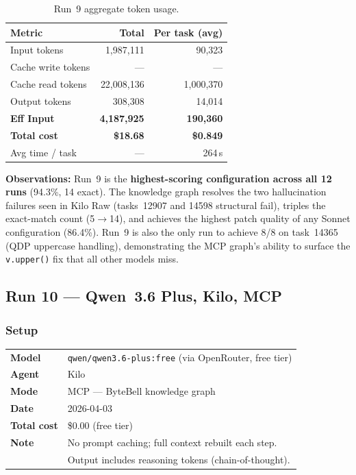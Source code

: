 \begin{table}[h]
\centering
\caption{Run~9 aggregate token usage.}\label{tab:r9-tokens}
\begin{tabular}{lrr}
\toprule
\textbf{Metric} & \textbf{Total} & \textbf{Per task (avg)} \\
\midrule
Input tokens         & 1,987,111   & 90,323 \\
Cache write tokens   & ---         & --- \\
Cache read tokens    & 22,008,136  & 1,000,370 \\
Output tokens        & 308,308     & 14,014 \\
\midrule
\textbf{Eff Input}   & \textbf{4,187,925} & \textbf{190,360} \\
\textbf{Total cost}  & \textbf{\$18.68}   & \textbf{\$0.849} \\
Avg time / task      & ---         & 264\,s \\
\bottomrule
\end{tabular}
\end{table}

\noindent
\textbf{Observations:} Run~9 is the \textbf{highest-scoring configuration across all
12 runs} (94.3\%, 14 exact). The knowledge graph resolves the two hallucination
failures seen in Kilo Raw (tasks~12907 and 14598 structural fail), triples the
exact-match count (5$\to$14), and achieves the highest patch quality of any
Sonnet configuration (86.4\%).
Run~9 is also the only run to achieve 8/8 on task~14365 (QDP uppercase
handling), demonstrating the MCP graph's ability to surface
the \texttt{v.upper()} fix that all other models miss.

\subsection{Run 10 --- Qwen~3.6 Plus, Kilo, MCP}
\label{sec:run10}

\subsubsection{Setup}

\begin{tabular}{ll}
\textbf{Model}     & \texttt{qwen/qwen3.6-plus:free} (via OpenRouter, free tier) \\
\textbf{Agent}     & Kilo \\
\textbf{Mode}      & MCP --- ByteBell knowledge graph \\
\textbf{Date}      & 2026-04-03 \\
\textbf{Total cost} & \$0.00 (free tier) \\
\textbf{Note}      & No prompt caching; full context rebuilt each step. \\
                   & Output includes reasoning tokens (chain-of-thought). \\
\end{tabular}


